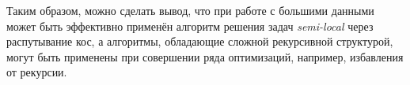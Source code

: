 Таким образом, можно сделать вывод, что  при работе с большими данными может быть эффективно применён алгоритм решения задач \emph{semi-local} через распутывание кос, а алгоритмы, обладающие сложной рекурсивной структурой, могут быть применены при совершении ряда оптимизаций, например, избавления от рекурсии.






